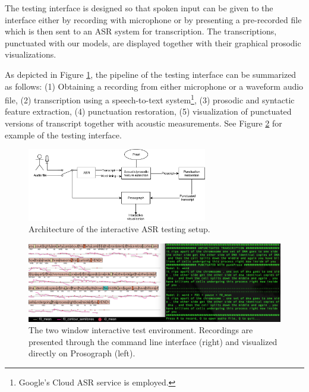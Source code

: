 The testing interface is designed so that spoken input can be given to the interface either by recording with microphone or by presenting a pre-recorded file which is then sent to an ASR system for transcription. The transcriptions, punctuated with our models, are displayed together with their graphical prosodic visualizations. 

As depicted in Figure \ref{punkProse:figure:testing_system}, the pipeline of the testing interface can be summarized as follows: (1) Obtaining a recording from either microphone or a waveform audio file, (2) transcription using a speech-to-text system\footnote{Google's Cloud ASR service is employed.}, (3) prosodic and syntactic feature extraction, (4) punctuation restoration, (5) visualization of punctuated versions of transcript together with acoustic measurements. See Figure \ref{punkProse:testing_interface} for example of the testing interface. 

\begin{figure}
\begin{center}
\includegraphics[width=0.7\textwidth]{img/punkProse_setup.pdf}
\caption{Architecture of the interactive ASR testing setup.}
\label{punkProse:figure:testing_system}
\end{center}
\end{figure}

\begin{figure}
\begin{center}
\includegraphics[width=1.0\textwidth]{img/interface-5.png}
\caption{The two window interactive test environment. Recordings are presented through the command line interface (right) and visualized directly on Prosograph (left).}
\label{punkProse:testing_interface}
\end{center}
\end{figure}

